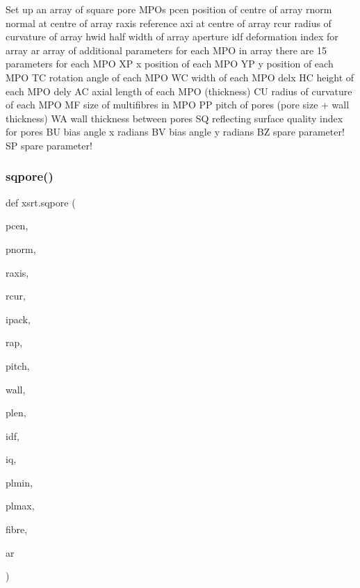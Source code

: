 \begin{DoxyVerb}Set up an array of square pore MPOs
    pcen      position of centre of array
    rnorm     normal at centre of array
    raxis     reference axi at centre of array
    rcur      radius of curvature of array
    hwid      half width of array aperture
    idf       deformation index for array
    ar        array of additional parameters for each MPO in array
              there are 15 parameters for each MPO
              XP     x position of each MPO
              YP     y position of each MPO
              TC     rotation angle of each MPO
              WC     width of each MPO delx 
              HC     height of each MPO dely 
              AC     axial length of each MPO (thickness)
              CU     radius of curvature of each MPO
              MF     size of multifibres in MPO
              PP     pitch of pores (pore size + wall thickness)
              WA     wall thickness between pores
              SQ     reflecting surface quality index for pores
              BU     bias angle x radians
              BV     bias angle y radians
              BZ     spare parameter!
              SP     spare parameter!
\end{DoxyVerb}
 \mbox{\label{namespacexsrt_aef3d3475a31e4d0f7294a7adcfb4ca1d}} 
\subsubsection{\texorpdfstring{sqpore()}{sqpore()}}
{\footnotesize\ttfamily def xsrt.\+sqpore (\begin{DoxyParamCaption}\item[{}]{pcen,  }\item[{}]{pnorm,  }\item[{}]{raxis,  }\item[{}]{rcur,  }\item[{}]{ipack,  }\item[{}]{rap,  }\item[{}]{pitch,  }\item[{}]{wall,  }\item[{}]{plen,  }\item[{}]{idf,  }\item[{}]{iq,  }\item[{}]{plmin,  }\item[{}]{plmax,  }\item[{}]{fibre,  }\item[{}]{ar }\end{DoxyParamCaption})}

